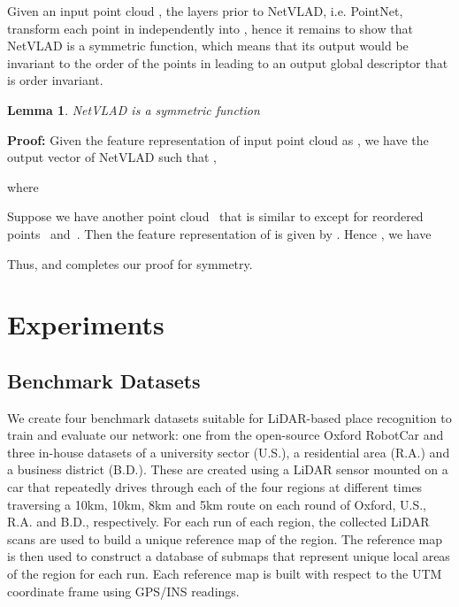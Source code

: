 \documentclass[10pt,twocolumn,letterpaper]{article}
\newtheorem{lemma}{Lemma}
\begin{document}
Given an input point cloud , the layers prior to NetVLAD, i.e. PointNet, transform each point in  independently into , hence it remains to show that NetVLAD is a symmetric function, which means that its output  would be invariant to the order of the points in  leading to an output global descriptor  that is order invariant.
\begin{lemma}
	NetVLAD is a symmetric function
\end{lemma}
\textbf{Proof:} Given the feature representation of input point cloud  as , we have the output vector  of NetVLAD such that ,

where

Suppose we have another point cloud ~that is similar to  except for reordered points ~and~. Then the feature representation of  is given by . Hence , we have

Thus,  and completes our proof for symmetry.  



    

 	\section{Experiments}
\vspace{-0.1cm}
\subsection{Benchmark Datasets}
\vspace{-0.1cm}
We create four benchmark datasets suitable for LiDAR-based place recognition to train and evaluate our network: one from the open-source Oxford RobotCar \cite{RobotCarDatasetIJRR} and three in-house datasets of a university sector (U.S.), a residential area (R.A.) and a business district (B.D.).
These are created using a LiDAR sensor mounted on a car that repeatedly drives through each of the four regions at different times traversing a 10km, 10km, 8km and 5km route on each round of Oxford, U.S., R.A. and B.D., respectively. For each run of each region, the collected LiDAR scans are used to build a unique reference map of the region. The reference map is then used to construct a database of submaps that represent unique local areas of the region for each run. Each reference map is built with respect to the UTM coordinate frame using GPS/INS readings. 
\newline
\vspace{-0.3cm}
\end{document}
